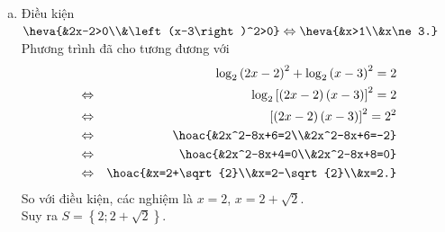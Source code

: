 \begin{bt}
{\begin{enumerate}[a)]
\begin{eqnarray*}
				&\Leftrightarrow& \log_2(x+1)=\log_22 \cdot (x-1)\\
				&\Leftrightarrow& x+1=2x-2\\
				&\Leftrightarrow& x=3.
			\end{eqnarray*}
			\item Điều kiện $\heva{&2x-2>0\\&\left(x-3\right)^2>0} \Leftrightarrow \heva{&x>1\\&x\ne 3.}$\\
			Phương trình đã cho tương đương với
			\begin{eqnarray*}
				&  &\log_{2}\left(2x-2\right)^2+\log_{2}\left(x-3\right)^2=2\\
				& \Leftrightarrow & \log_{2}\left[\left(2x-2\right)\left(x-3\right)\right]^2=2\\ & \Leftrightarrow & \left[\left(2x-2\right)\left(x-3\right)\right]^2=2^2\\
				& \Leftrightarrow & \hoac{&2x^2-8x+6=2\\&2x^2-8x+6=-2}\\
				& \Leftrightarrow & \hoac{&2x^2-8x+4=0\\&2x^2-8x+8=0}\\
				& \Leftrightarrow & \hoac{&x=2+\sqrt{2}\\&x=2-\sqrt{2}\\&x=2.}
			\end{eqnarray*}
			So với điều kiện, các nghiệm là $x=2$, $x=2+\sqrt{2}$.\\
			Suy ra  $S=\left\lbrace 2;2+\sqrt{2}\right\rbrace$.
	\end{enumerate}}
\end{bt}

